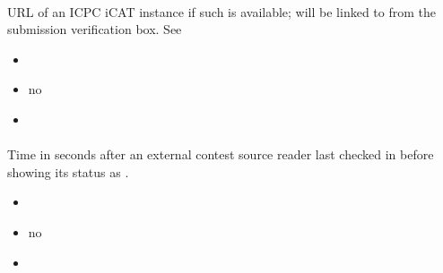 \documentclass[a4paper,10pt,english,openany]{sphinxmanual}
\begin{document}
\paragraph{}
\label{\detokenize{configuration-reference:icat-url}}
\sphinxAtStartPar
URL of an ICPC iCAT instance if such is available; will be linked to from the submission verification box. See 
\begin{itemize}
\item {} 
\sphinxAtStartPar
{} 

\item {} 
\sphinxAtStartPar
{} no

\item {} 
\sphinxAtStartPar
{} \sphinxcode{\sphinxupquote{\textquotesingle{}\textquotesingle{}}}

\end{itemize}


\paragraph{}
\label{\detokenize{configuration-reference:external-contest-source-critical}}
\sphinxAtStartPar
Time in seconds after an external contest source reader last checked in before showing its status as .
\begin{itemize}
\item {} 
\sphinxAtStartPar
{} 

\item {} 
\sphinxAtStartPar
{} no

\item {} 
\sphinxAtStartPar
{} 

\end{itemize}
\end{document}
